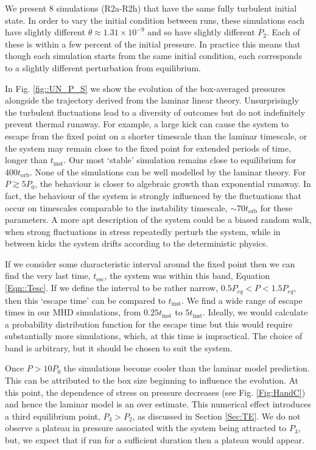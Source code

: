 \documentclass[useAMS]{mn2e}
\begin{document}
We present 8 simulations (R2a-R2h) that have the same fully turbulent
initial state. In order to vary the initial condition
between runs, these simulations each have slightly different
$\theta\approx1.31\times10^{-9}$ and so have slightly different
$P_{2}$. Each of these is within a few percent of the initial
pressure. In practice this means that though each simulation starts
from the same initial condition, each corresponds to a slightly
different perturbation from equilibrium.

In Fig. \ref{fig::UN_P_S} we show the evolution of the box-averaged
pressures alongside the trajectory derived from the laminar 
linear theory. Unsurprisingly the
turbulent fluctuations lead to a diversity of outcomes but do not
indefinitely prevent thermal runaway. For example, a large kick can
cause the system to escape from the fixed point on a shorter timescale
than the laminar timescale, or the system may remain close to the
fixed point for extended periods of time, longer than
$t_{\text{inst}}$.
Our most `stable' simulation remains close to equilibrium for
$400t_{\text{orb}}$.
 None
of the simulations can be well modelled by the laminar theory. For
$P\gtrsim5P_{0}$, the behaviour is closer to algebraic growth than
exponential runaway. In fact, the behaviour of the system is strongly
influenced by the fluctuations that occur on timescales comparable to
the instability timescale, $\sim 70 t_{\text{orb}}$ for these
parameters. 
A more apt description of
the system could be a biased random walk, when strong fluctuations in
stress repeatedly perturb the system, while in between kicks the
system drifts according  to the deterministic physics. 

If we consider some characteristic interval around the fixed point
 then we can find the very last time,
$t_{\text{esc}}$, the system was within this band, Equation
\eqref{Eqn::Tesc}. If we define the interval to be rather narrow,
$0.5P_{eq}<P<1.5P_{eq}$, then this `escape time' can be compared to
$t_{\text{inst}}$. We find a wide range of escape times in our MHD
simulations, from $0.25t_{\text{inst}}$ to $5t_{\text{inst}}$. Ideally, we would
calculate a probability distribution function for the escape time but
this would require substantially more simulations, which, at this time
is impractical. The choice of band is arbitrary, but  it should be chosen to suit the system.

Once $P>10P_{0}$ the simulations become cooler than
the laminar model prediction. This can be attributed to the box size
beginning to influence the evolution. At this point, the dependence of
stress on pressure decreases (see Fig. \ref{Fig:HandC}) and hence
the laminar model is an over estimate. This numerical effect
introduces a third equilibrium point, $P_{3}>P_{2}$, as discussed in
Section \ref{Sec:TE}. We do not observe a plateau in pressure
associated with the system being attracted to $P_{3}$, but, we expect
that if run for a sufficient duration then a  plateau would appear. 
\end{document}
